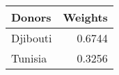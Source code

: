 \begin{tabular}{lr}
\toprule
  Donors &  Weights \\
\midrule
Djibouti &   0.6744 \\
 Tunisia &   0.3256 \\
\bottomrule
\end{tabular}
